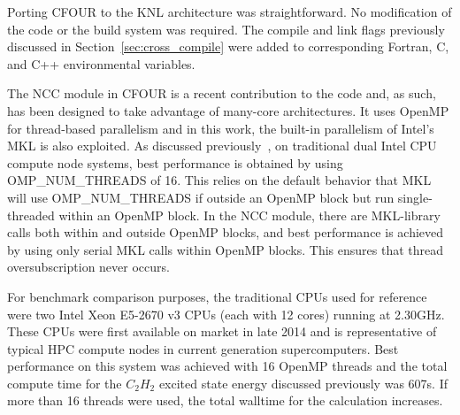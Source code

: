 Porting CFOUR to the KNL architecture was straightforward. No modification of the code or the build
system was required. The compile and link flags previously discussed in Section~\ref{sec:cross_compile}
were added to corresponding Fortran, C, and C++ environmental variables.

The NCC module in CFOUR is a recent contribution to the code and, as such, has been designed to take
advantage of many-core architectures. It uses OpenMP for thread-based parallelism and in this work, the
built-in parallelism of Intel's MKL is also exploited. As discussed previously~\cite{ncc:15},
on traditional dual Intel CPU compute node systems, best performance is obtained
by using OMP\_NUM\_THREADS of 16. This relies on the default behavior that MKL will use OMP\_NUM\_THREADS
if outside an OpenMP block but run single-threaded within an OpenMP block.
In the NCC module, there are MKL-library calls both within and outside OpenMP blocks, and best performance is
achieved by using only serial MKL calls within OpenMP blocks. This ensures that thread oversubscription never occurs.

For benchmark comparison purposes, the traditional CPUs used for reference were two Intel Xeon E5-2670 v3 CPUs
(each with 12 cores) running at 2.30GHz. These CPUs were first available on market in late 2014 and is
representative of typical HPC compute nodes in current generation supercomputers. Best performance on this
system was achieved with 16 OpenMP threads and the total compute time for the $C_2H_2$ excited state energy
discussed previously was 607s.
If more than 16 threads were used, the total walltime for the calculation increases.

